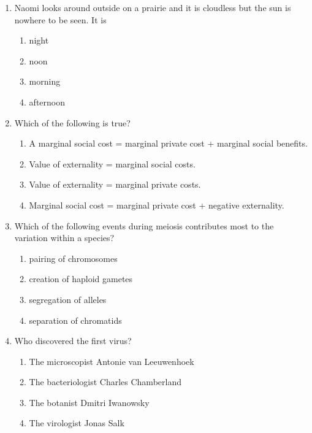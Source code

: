 \documentclass[12pt]{article}
\begin{document}
\begin{enumerate}[label=\arabic*.]
\begin{enumerate}[label=(\alph*)]
    \item they are cold
    \item road need it
    \item they are lumpy
    \item ice ruins them
\end{enumerate}
\item Naomi looks around outside on a prairie and it is cloudless but the sun is nowhere to be seen. It is
\begin{enumerate}[label=(\alph*)]
    \item night
    \item noon
    \item morning
    \item afternoon
\end{enumerate}
\item Which of the following is true?
\begin{enumerate}[label=(\alph*)]
    \item A marginal social cost = marginal private cost + marginal social benefits.
    \item Value of externality = marginal social costs.
    \item Value of externality = marginal private costs.
    \item Marginal social cost = marginal private cost + negative externality.
\end{enumerate}
\item Which of the following events during meiosis contributes most to the variation within a species?
\begin{enumerate}[label=(\alph*)]
    \item pairing of chromosomes
    \item creation of haploid gametes
    \item segregation of alleles
    \item separation of chromatids
\end{enumerate}
\item Who discovered the first virus?
\begin{enumerate}[label=(\alph*)]
    \item The microscopist Antonie van Leeuwenhoek
    \item The bacteriologist Charles Chamberland
    \item The botanist Dmitri Iwanowsky
    \item The virologist Jonas Salk
\end{enumerate}

\end{enumerate}
\end{document}
